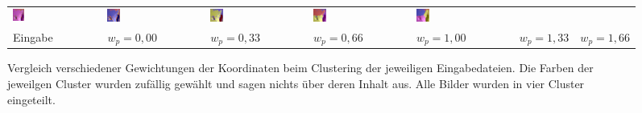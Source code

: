 \begin{figure}[h!]
\begin{tabular}{C{0.14\textwidth}C{0.14\textwidth}C{0.14\textwidth}C{0.14\textwidth}C{0.14\textwidth}C{0.14\textwidth}C{0.14\textwidth}}
		\includegraphics[width=0.14\textwidth]{images/gen/spatial_weight/p03_04.png_0.33.png} &
		\includegraphics[width=0.14\textwidth]{images/gen/spatial_weight/p03_04.png_0.66.png} &
		\includegraphics[width=0.14\textwidth]{images/gen/spatial_weight/p03_04.png_1.00.png} &
		\includegraphics[width=0.14\textwidth]{images/gen/spatial_weight/p03_04.png_1.33.png} &
		\includegraphics[width=0.14\textwidth]{images/gen/spatial_weight/p03_04.png_1.66.png} \\
		
		\hspace{2pt}\newline\centering Eingabe & 
		\hspace{2pt}\newline\centering $w_p=0,00$ &
		\hspace{2pt}\newline\centering $w_p=0,33$ &
		\hspace{2pt}\newline\centering $w_p=0,66$ &
		\hspace{2pt}\newline\centering $w_p=1,00$ &
		\hspace{2pt}\newline\centering $w_p=1,33$ &
		\hspace{2pt}\newline\centering $w_p=1,66$
	\end{tabular}
	\caption{Vergleich verschiedener Gewichtungen der Koordinaten beim Clustering der jeweiligen Eingabedateien. Die Farben der jeweilgen Cluster wurden zufällig gewählt und sagen nichts über deren Inhalt aus. Alle Bilder wurden in vier Cluster eingeteilt.}
	\label{fig:filterbank_weights_pos}
\end{figure}

